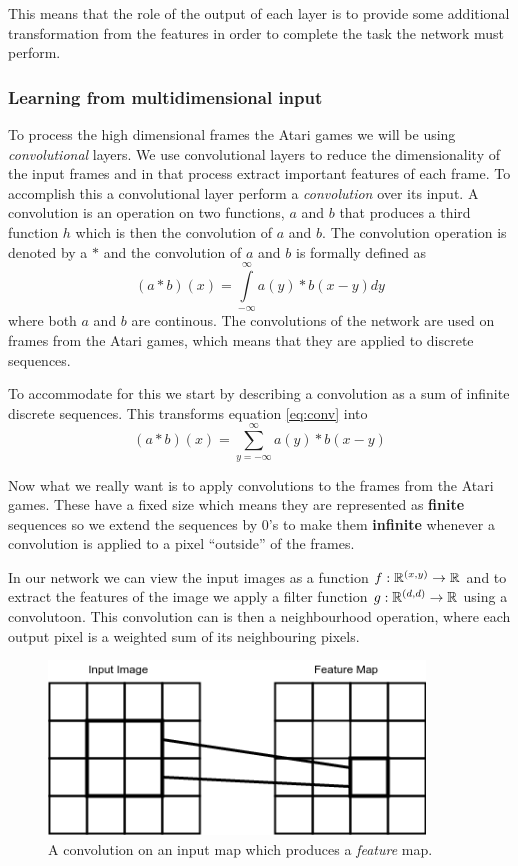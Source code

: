 \documentclass[11pt]{article}
\begin{document}
This means that the role of the output of each layer is to provide some additional
transformation from the features in order to complete the task the network
must perform\cite{DeepLearningBook}.

\subsubsection{Learning from multidimensional input}

To process the high dimensional frames the Atari games we will be using
\textit{convolutional} layers.
We use convolutional layers to reduce the dimensionality of the
input frames and in that process extract important features of each frame.
To accomplish this a convolutional layer perform a \textit{convolution} over
its input.
A convolution is an operation on two functions, $a$ and $b$ that produces a third function
$h$ which is then the convolution of $a$ and $b$\cite{DeepLearningBook}.
The convolution operation is denoted by a $\ast$ and the convolution of $a$ and $b$
is formally defined as
\begin{equation}\label{eq:conv}
    (a \ast b)(x) = \int\limits_{-\infty}^{\infty} a(y) * b(x - y) dy
\end{equation}
where both $a$ and $b$ are continous.
The convolutions of the network are used on frames from the Atari games, which
means that they are applied to discrete sequences.

To accommodate for this we start by describing a convolution as a sum of infinite
discrete sequences.
This transforms equation \ref{eq:conv} into
\begin{equation}
    (a \ast b)(x) = \sum\limits_{y = -\infty}^{\infty} a(y) * b(x - y)
\end{equation}

Now what we really want is to apply convolutions to the frames from the Atari games.
These have a fixed size which means they are represented as \textbf{finite} sequences
so we extend the sequences by 0's to make them \textbf{infinite} whenever a convolution
is applied to a pixel “outside” of the frames.

In our network we can view the input images as a function $f : \mathbb{R}^{(x, y)} \to \mathbb{R}$ and
to extract the features of the image we apply a filter function $g : \mathbb{R}^{(d, d)} \to \mathbb{R}$
using a convolutoon.
This convolution can is then a neighbourhood operation, where each output pixel
is a weighted sum of its neighbouring pixels\cite{convSE}.
\begin{figure}[!h]
    \centering
    \includegraphics[width=10cm]{include/conv.png}
    \caption{A convolution on an input map which produces a \textit{feature} map.}
    \label{fig:conv}
\end{figure}
\end{document}
